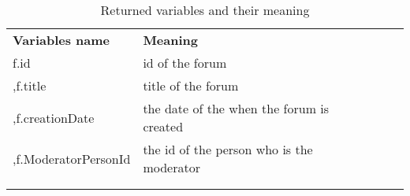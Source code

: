  \begin{table}[!ht]
\begin{tabular}{lllll}
\cline{1-2}
\multicolumn{1}{|l|}{\textbf{Variables name}} & \multicolumn{1}{l|}{\textbf{Meaning}}                          &  &  &  \\ \cline{1-2}
\multicolumn{1}{|l|}{f.id}                    & \multicolumn{1}{l|}{id of the forum}                           &  &  &  \\ \cline{1-2}
\multicolumn{1}{|l|}{,f.title}                & \multicolumn{1}{l|}{title of the forum}                        &  &  &  \\ \cline{1-2}
\multicolumn{1}{|l|}{,f.creationDate}         & \multicolumn{1}{l|}{the date of the when the forum is created} &  &  &  \\ \cline{1-2}
\multicolumn{1}{|l|}{,f.ModeratorPersonId}    & \multicolumn{1}{l|}{the id of the person who is the moderator} &  &  &  \\ \cline{1-2}
                                              &                                                                &  &  &  \\
                                              &                                                                &  &  & 
\end{tabular}
\caption{Returned variables and their meaning}
\label{RetCypher3BITable}
\end{table}
